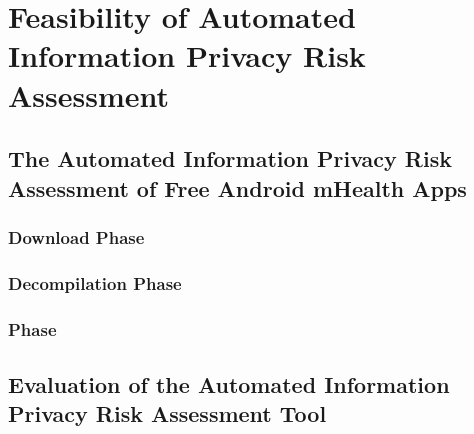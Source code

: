 \section{Feasibility of Automated Information Privacy Risk Assessment}

\subsection{The Automated Information Privacy Risk Assessment of Free Android mHealth Apps}

\subsubsection{Download Phase}

\subsubsection{Decompilation Phase}

\subsubsection{\Sca Phase}

\subsection{Evaluation of the Automated Information Privacy Risk Assessment Tool}